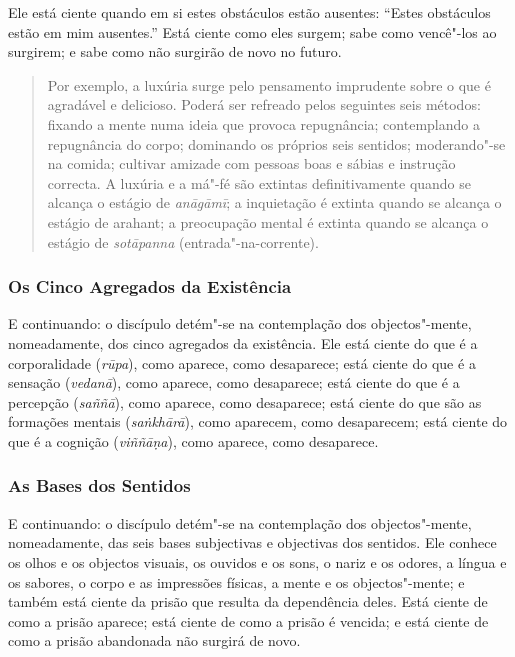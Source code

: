 Ele está ciente quando em si estes obstáculos estão ausentes: “Estes obstáculos
estão em mim ausentes.” Está ciente como eles surgem; sabe como vencê"-los ao
surgirem; e sabe como não surgirão de novo no futuro.


\begin{quote}
  Por exemplo, a luxúria surge pelo pensamento imprudente sobre o que é
  agradável e delicioso. Poderá ser refreado pelos seguintes seis métodos:
  fixando a mente numa ideia que provoca repugnância; contemplando a repugnância
  do corpo; dominando os próprios seis sentidos; moderando"-se na comida;
  cultivar amizade com pessoas boas e sábias e instrução correcta. A luxúria e a
  má"-fé são extintas definitivamente quando se alcança o estágio de
  \emph{anāgāmī}; a inquietação é extinta quando se alcança o estágio de
  arahant; a preocupação mental é extinta quando se alcança o estágio de
  \emph{sotāpanna} (entrada"-na-corrente).
\end{quote}

\subsubsection{Os Cinco Agregados da Existência}


E continuando: o discípulo detém"-se na contemplação dos objectos"-mente,
nomeadamente, dos cinco agregados da existência. Ele está ciente do que é a
corporalidade (\emph{rūpa}), como aparece, como desaparece; está ciente do que é
a sensação (\emph{vedanā}), como aparece, como desaparece; está ciente do que é
a percepção (\emph{saññā}), como aparece, como desaparece; está ciente do que
são as formações mentais (\emph{saṅkhārā}), como aparecem, como desaparecem;
está ciente do que é a cognição (\emph{viññāṇa}), como aparece, como desaparece.

\subsubsection{As Bases dos Sentidos}


E continuando: o discípulo detém"-se na contemplação dos objectos"-mente,
nomeadamente, das seis bases subjectivas e objectivas dos sentidos. Ele conhece
os olhos e os objectos visuais, os ouvidos e os sons, o nariz e os odores, a
língua e os sabores, o corpo e as impressões físicas, a mente e os
objectos"-mente; e também está ciente da prisão que resulta da dependência deles.
Está ciente de como a prisão aparece; está ciente de como a prisão é vencida; e
está ciente de como a prisão abandonada não surgirá de novo.

